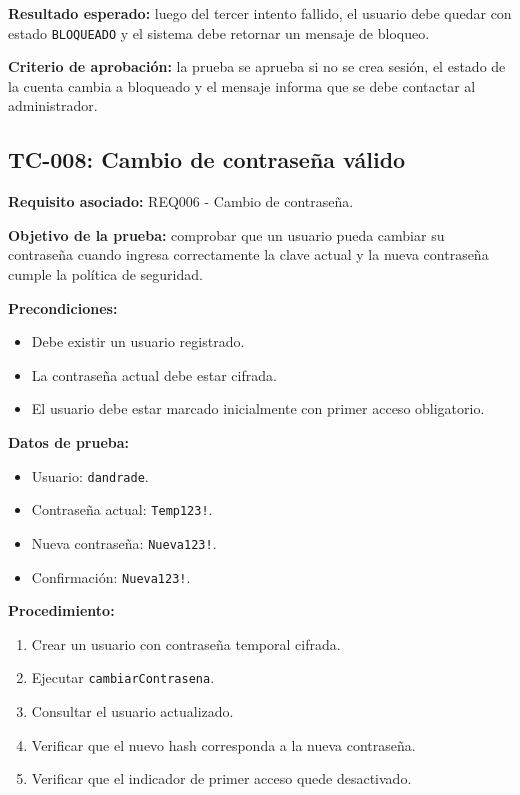 \documentclass[12pt,a4paper]{article}
\begin{document}
\textbf{Resultado esperado:} luego del tercer intento fallido, el usuario debe quedar con estado \texttt{BLOQUEADO} y el sistema debe retornar un mensaje de bloqueo.

\textbf{Criterio de aprobación:} la prueba se aprueba si no se crea sesión, el estado de la cuenta cambia a bloqueado y el mensaje informa que se debe contactar al administrador.

\subsection{TC-008: Cambio de contraseña válido}

\textbf{Requisito asociado:} REQ006 - Cambio de contraseña.

\textbf{Objetivo de la prueba:} comprobar que un usuario pueda cambiar su contraseña cuando ingresa correctamente la clave actual y la nueva contraseña cumple la política de seguridad.

\textbf{Precondiciones:}
\begin{itemize}[leftmargin=*]
    \item Debe existir un usuario registrado.
    \item La contraseña actual debe estar cifrada.
    \item El usuario debe estar marcado inicialmente con primer acceso obligatorio.
\end{itemize}

\textbf{Datos de prueba:}
\begin{itemize}[leftmargin=*]
    \item Usuario: \texttt{dandrade}.
    \item Contraseña actual: \texttt{Temp123!}.
    \item Nueva contraseña: \texttt{Nueva123!}.
    \item Confirmación: \texttt{Nueva123!}.
\end{itemize}

\textbf{Procedimiento:}
\begin{enumerate}[leftmargin=*]
    \item Crear un usuario con contraseña temporal cifrada.
    \item Ejecutar \texttt{cambiarContrasena}.
    \item Consultar el usuario actualizado.
    \item Verificar que el nuevo hash corresponda a la nueva contraseña.
    \item Verificar que el indicador de primer acceso quede desactivado.
\end{enumerate}
\end{document}
